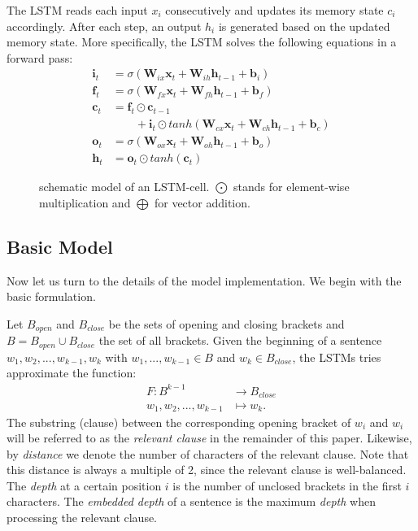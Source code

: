 \documentclass[11pt,a4paper]{article}
\begin{document}
The LSTM reads each input $x_i$ consecutively and updates its memory state $c_i$ accordingly. After each step, an output $h_i$ is generated based on the updated memory state. More specifically, the LSTM solves the following equations in a forward pass:
%
\begin{equation}
\begin{split}
    \mathbf{i}_t &= \sigma(\mathbf{W}_{ix}\mathbf{x}_t+\mathbf{W}_{ih}\mathbf{h}_{t-1}+\mathbf{b}_i) \\
    \mathbf{f}_t &= \sigma(\mathbf{W}_{fx}\mathbf{x}_t+\mathbf{W}_{fh}\mathbf{h}_{t-1}+\mathbf{b}_f) \\
    \mathbf{c}_t &= \mathbf{f}_t \odot \mathbf{c}_{t-1}\\
    & \qquad +\mathbf{i}_t \odot tanh(\mathbf{W}_{cx}\mathbf{x}_t + \mathbf{W}_{ch}\mathbf{h}_{t-1}+\mathbf{b}_c) \\
    \mathbf{o}_t &= \sigma(\mathbf{W}_{ox}\mathbf{x}_t + \mathbf{W}_{oh}\mathbf{h}_{t-1} + \mathbf{b}_o)\\
    \mathbf{h}_t &= \mathbf{o}_t \odot tanh(\mathbf{c}_t) 
    \label{eq:lstm_equations}
\end{split}
\end{equation}

\begin{figure}[ht]
    \centering
    
    \caption{schematic model of an LSTM-cell. $\bigodot$ stands for element-wise multiplication and $\bigoplus$ for vector addition.}
    \label{fig:lstm_cell}

\end{figure}
%
\subsection{Basic Model}
\label{subsec:basic_model}
Now let us turn to the details of the model implementation.  We begin with the basic formulation.

Let $B_{open}$ and $B_{close}$ be the sets of opening and closing brackets and $B = B_{open} \cup B_{close}$ the set of all brackets. Given the beginning of a sentence $w_1, w_2, ..., w_{k-1}, w_k$ with $w_1, ..., w_{k-1} \in B$ and $w_k \in B_{close}$, the LSTMs tries approximate the function:
%
\begin{align*}
  F \colon B^{k-1} &\to B_{close}\\
  w_1, w_2, ..., w_{k-1} &\mapsto w_k.
  \label{eq:brackets_task_definition}
\end{align*}
%
The substring (clause) between the corresponding opening bracket of $w_i$ and $w_i$ will be referred to as the \emph{relevant clause} in the remainder of this paper. Likewise, by \emph{distance} we denote the number of characters of the relevant clause. Note that this distance is always a multiple of 2, since the relevant clause is well-balanced. The \emph{depth} at a certain position $i$ is the number of unclosed brackets in the first $i$ characters. The \emph{embedded depth} of a sentence is the maximum \emph{depth} when processing the relevant clause.
\end{document}
